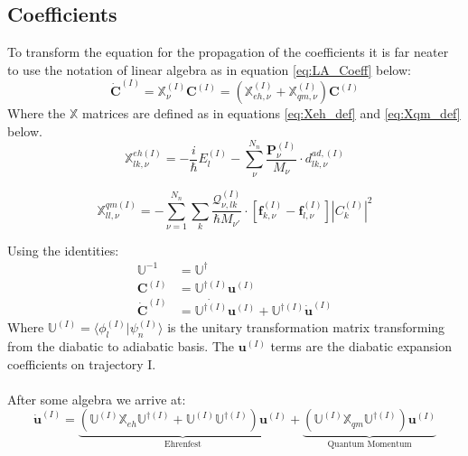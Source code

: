 \subsection{Coefficients}
To transform the equation for the propagation of the coefficients it is far neater to use the notation of linear algebra as in equation \eqref{eq:LA_Coeff} below:
\begin{equation}
	\dot{\mathbf{C}}^{(I)} = \mathbb{X}_{\nu}^{(I)} \mathbf{C}^{(I)} = \left(\mathbb{X}_{eh, \nu}^{(I)} + \mathbb{X}_{qm, \nu}^{(I)}\right) \mathbf{C}^{(I)}
	\label{eq:LA_Coeff}
\end{equation}
Where the $\mathbb{X}$ matrices are defined as in equations \eqref{eq:Xeh_def} and \eqref{eq:Xqm_def} below.
\begin{equation}
  \mathbb{X}_{lk, \nu}^{eh (I)} = -\frac{i}{\hbar} E_{l}^{(I)} - \sum_{\nu}^{N_{n}}\frac{\mathbf{P}_{\nu}^{(I)}}{M_{\nu}} \cdot d_{lk, \nu}^{ad, (I)}
  \label{eq:Xeh_def}
\end{equation}

\begin{equation}
  \mathbb{X}_{ll, \nu}^{qm (I)} = -\sum_{\nu=1}^{N_{n}} \sum_{k} \frac{\mathcal{Q}_{\nu, lk}^{(I)}}{\hbar M_{\nu'}} \cdot \left[ \mathbf{f}_{k, \nu}^{(I)} - \mathbf{f}_{l, \nu}^{(I)} \right]  |C_{k}^{(I)}|^2
  \label{eq:Xqm_def}
\end{equation}


\noindent Using the identities:
\begin{align}
  \mathbb{U}^{-1} &= \mathbb{U}^{\dagger} \\
  \mathbf{C}^{(I)} &= \mathbb{U}^{\dagger (I)} \mathbf{u}^{(I)} \\
  \dot{\mathbf{C}}^{(I)} &= \dot{\mathbb{U}^{\dagger (I)}} \mathbf{u}^{(I)} + \mathbb{U}^{\dagger (I)}\dot{\mathbf{u}}^{(I)}
\end{align}
Where $\mathbb{U}^{(I)} = \langle \phi_{l}^{(I)} | \psi_{n}^{(I)} \rangle$ is the unitary transformation matrix transforming from the diabatic to adiabatic basis. The $\mathbf{u}^{(I)}$ terms are the diabatic expansion coefficients on trajectory I.
\\\\
\noindent After some algebra we arrive at:
\begin{equation}
  \dot{\mathbf{u}}^{(I)} = \underbrace{\left(\mathbb{U}^{(I)} \mathbb{X}_{eh} \mathbb{U}^{\dagger (I)} + \mathbb{U}^{(I)}\mathbb{U}^{\dagger (I)}\right) \mathbf{u}^{(I)}}_{\text{Ehrenfest}} + \underbrace{\left(\mathbb{U}^{(I)} \mathbb{X}_{qm} \mathbb{U}^{\dagger (I)} \right) \mathbf{u}^{(I)}}_{\text{Quantum Momentum}}
  \label{eq:diabMatEq}
\end{equation}

